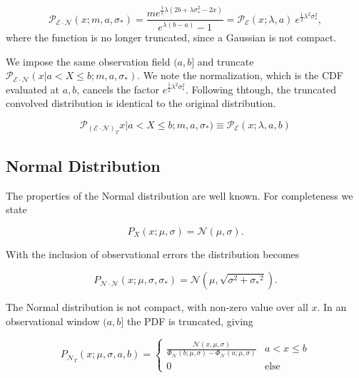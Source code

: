 \documentclass[twocolumn]{aastex631}
\newcommand{\mcal}[1]{\mathcal{#1}}
\newcommand{\Exp}[1]{e^{#1}}
\newcommand{\pdf}{\mcal{P}}
\newcommand{\sigobs}{{\sigma_*}}
\begin{document}
        \begin{equation}
            \pdf_{\mcal{E}\cdot\mcal{N}}(x;m,a,\sigma_*) = \frac{m  e^{\frac{1}{2} \lambda  \left(2 b+\lambda  \sigma _*^2-2 x\right)}}{e^{\lambda  (b-a)}-1} = \pdf_{\mcal{E}}(x;\lambda,a) \ \Exp{\frac{1}{2}\lambda^2 \sigma_*^2},
        \end{equation}
        where the function is no longer truncated, since a Gaussian is not compact.

        We impose the same observation field $(a, b]$ and truncate $\pdf_{\mcal{E}\cdot\mcal{N}}(x | a < X \leq b;m,a,\sigma_*)$.
        We note the normalization, which is the CDF evaluated at $a, b$, cancels the factor
        $\Exp{\frac{1}{2}\lambda^2 \sigma_*^2}$. Following thtough, the truncated convolved distribution is identical to the original distribution.

        \begin{equation}
            \pdf_{(\mcal{E}\cdot\mcal{N})_T}x | a < X \leq b;m,a,\sigma_*) \equiv \pdf_{\mcal{E}}(x; \lambda, a, b)
        \end{equation}

    \vspace{10pt}
    \subsection{Normal Distribution} \label{app:sub:normal_distribution}

        The properties of the Normal distribution are well known. For completeness we state

        \begin{equation}
            P_X(x; \mu, \sigma) = \mcal{N}(\mu, \sigma).
        \end{equation}

        With the inclusion of observational errors the distribution becomes

        \begin{equation}
            P_{\mcal{N}\cdot\mcal{N}}(x; \mu, \sigma, \sigobs) = \mcal{N}(\mu, \sqrt{\sigma^2 + \sigobs^2}).
        \end{equation}

        The Normal distribution is not compact, with non-zero value over all $x$. In an observational window $(a,b]$ the PDF is truncated, giving

        \begin{equation}
            P_{\mcal{N}_T}(x; \mu, \sigma, a, b) = \begin{cases}
                \frac{\mcal{N}(x, \mu, \sigma)}{\Phi_\mcal{N}(b; \mu, \sigma) - \Phi_\mcal{N}(a; \mu, \sigma)} & a < x \leq b \\
                0 & \text{else}
            \end{cases}
        \end{equation}
\end{document}
